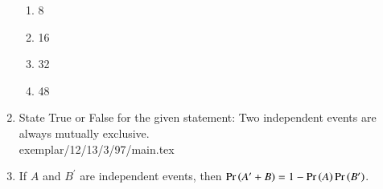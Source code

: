 \begin{enumerate}[label=\thesubsection.\arabic*,ref=\thesubsection.\theenumi,resume*]
\begin{table}[htb]
\caption{}
\label{tab:exemplar/12/13/3/87}
\end{table}
\begin{enumerate}
\item 8
\item 16
\item 32
\item 48
\end{enumerate}
\solution

\item State True or False for the given statement:
Two independent events are always mutually exclusive.\\
\solution 
 {exemplar/12/13/3/97/main.tex}
\item If $A$ and $B^\prime$ are independent events, then $\Pr\left(A^\prime+B\right)=1-\Pr\left(A\right)\Pr\left(B^\prime\right)$.\\
\solution

\end{enumerate}
